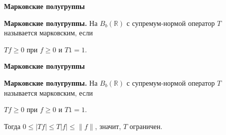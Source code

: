 \documentclass[11pt]{article}
\newcommand{\R}{\mathbb{R}}
\begin{document}
\newpage

\begin{center}
{\color{notaeYELLOW}\bfseries\fontsize{44}{52}\selectfont Марковские полугруппы}
\end{center}
\vspace*{\fill}
\begin{center}
\fontsize{36}{43}\selectfont
\parbox{\linewidth}{\centering\noindent \textbf{Марковские полугруппы.} На $B_b(\R)$ с супремум-нормой оператор $T$ называется марковским, если
\par}\vspace{0.4in}
\parbox{\linewidth}{\centering\noindent $Tf\ge0$ при $f\ge0$ и $T1=1$.
\par}\vspace{0.4in}
\end{center}
\vspace*{\fill}

\newpage

\begin{center}
{\color{notaeYELLOW}\bfseries\fontsize{44}{52}\selectfont Марковские полугруппы}
\end{center}
\vspace*{\fill}
\begin{center}
\fontsize{36}{43}\selectfont
\parbox{\linewidth}{\centering\noindent \textbf{Марковские полугруппы.} На $B_b(\R)$ с супремум-нормой оператор $T$ называется марковским, если
\par}\vspace{0.4in}
\parbox{\linewidth}{\centering\noindent $Tf\ge0$ при $f\ge0$ и $T1=1$.
\par}\vspace{0.4in}
\parbox{\linewidth}{\centering\noindent Тогда $0\le|Tf|\le T|f|\le\|f\|$, значит, $T$ ограничен.
\par}\vspace{0.4in}
\end{center}
\vspace*{\fill}

\newpage
\end{document}
